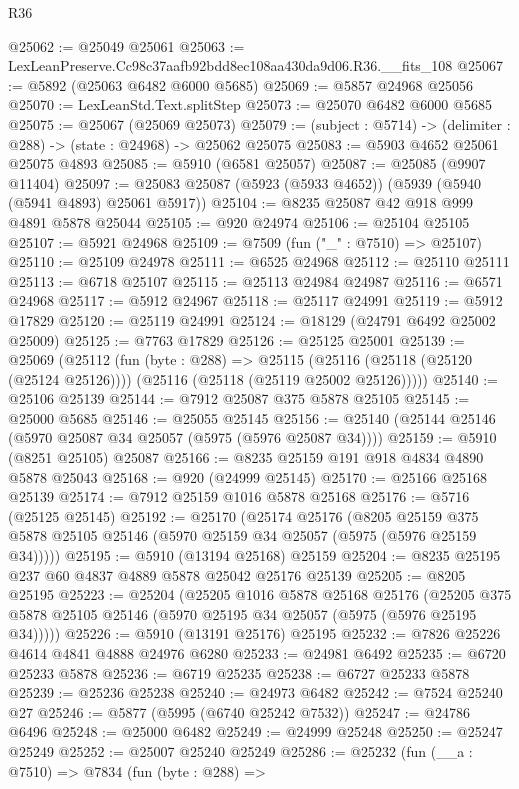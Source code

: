 \begin{lexlean}{R36}
\begin{coremodule}
@25062 := @25049 @25061
@25063 := LexLeanPreserve.Cc98c37aafb92bdd8ec108aa430da9d06.R36.__fits_108
@25067 := @5892 (@25063 @6482 @6000 @5685)
@25069 := @5857 @24968 @25056
@25070 := LexLeanStd.Text.splitStep
@25073 := @25070 @6482 @6000 @5685
@25075 := @25067 (@25069 @25073)
@25079 := (subject : @5714) -> (delimiter : @288) -> (state : @24968) -> @25062 @25075
@25083 := @5903 @4652 @25061 @25075 @4893
@25085 := @5910 (@6581 @25057)
@25087 := @25085 (@9907 @11404)
@25097 := @25083 @25087 (@5923 (@5933 @4652)) (@5939 (@5940 (@5941 @4893) @25061 @5917))
@25104 := @8235 @25087 @42 @918 @999 @4891 @5878 @25044
@25105 := @920 @24974
@25106 := @25104 @25105
@25107 := @5921 @24968
@25109 := @7509 (fun ("_" : @7510) => @25107)
@25110 := @25109 @24978
@25111 := @6525 @24968
@25112 := @25110 @25111
@25113 := @6718 @25107
@25115 := @25113 @24984 @24987
@25116 := @6571 @24968
@25117 := @5912 @24967
@25118 := @25117 @24991
@25119 := @5912 @17829
@25120 := @25119 @24991
@25124 := @18129 (@24791 @6492 @25002 @25009)
@25125 := @7763 @17829
@25126 := @25125 @25001
@25139 := @25069
    (@25112
      (fun (byte : @288) =>
      @25115 (@25116 (@25118 (@25120 (@25124 @25126)))) (@25116 (@25118 (@25119 @25002 @25126)))))
@25140 := @25106 @25139
@25144 := @7912 @25087 @375 @5878 @25105
@25145 := @25000 @5685
@25146 := @25055 @25145
@25156 := @25140 (@25144 @25146 (@5970 @25087 @34 @25057 (@5975 (@5976 @25087 @34))))
@25159 := @5910 (@8251 @25105) @25087
@25166 := @8235 @25159 @191 @918 @4834 @4890 @5878 @25043
@25168 := @920 (@24999 @25145)
@25170 := @25166 @25168 @25139
@25174 := @7912 @25159 @1016 @5878 @25168
@25176 := @5716 (@25125 @25145)
@25192 := @25170
    (@25174
      @25176
      (@8205 @25159 @375 @5878 @25105 @25146 (@5970 @25159 @34 @25057 (@5975 (@5976 @25159 @34)))))
@25195 := @5910 (@13194 @25168) @25159
@25204 := @8235 @25195 @237 @60 @4837 @4889 @5878 @25042 @25176 @25139
@25205 := @8205 @25195
@25223 := @25204
    (@25205
      @1016
      @5878
      @25168
      @25176
      (@25205 @375 @5878 @25105 @25146 (@5970 @25195 @34 @25057 (@5975 (@5976 @25195 @34)))))
@25226 := @5910 (@13191 @25176) @25195
@25232 := @7826 @25226 @4614 @4841 @4888 @24976 @6280
@25233 := @24981 @6492
@25235 := @6720 @25233 @5878
@25236 := @6719 @25235
@25238 := @6727 @25233 @5878
@25239 := @25236 @25238
@25240 := @24973 @6482
@25242 := @7524 @25240 @27
@25246 := @5877 (@5995 (@6740 @25242 @7532))
@25247 := @24786 @6496
@25248 := @25000 @6482
@25249 := @24999 @25248
@25250 := @25247 @25249
@25252 := @25007 @25240 @25249
@25286 := @25232
    (fun (__a : @7510) =>
    @7834
      (fun (byte : @288) =>

\end{coremodule}
\end{lexlean}
